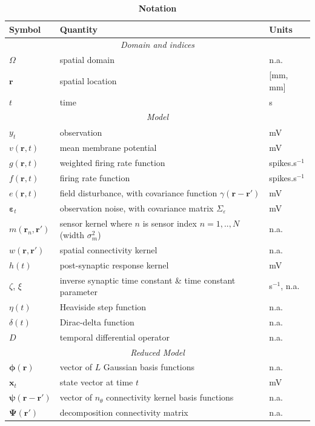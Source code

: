\documentclass[12pt]{iopart}
\begin{document}
\begin{table}[!ht]
\caption{
\bf{Notation}}
\begin{tabular}{|l|l|l|}
	\hline
	\textbf{Symbol} & \textbf{Quantity} & \textbf{Units}\\
	\hline
	\multicolumn{3}{|c|}{\emph{Domain and indices}}\\
	\hline
	$\Omega$ & spatial domain & n.a.\\
	$\mathbf{r}$ & spatial location & [mm, mm]\\
	$t$ & time & s\\
	\hline
	\multicolumn{3}{|c|}{\emph{Model}}\\
	\hline
    $y_t$ & observation & mV\\
    $v(\mathbf{r},t)$ & mean membrane potential & mV \\
	$g(\mathbf{r},t)$ & weighted firing rate function & spikes.s$^{-1}$\\
	$f(\mathbf{r},t)$ & firing rate function & spikes.s$^{-1}$\\
	$e(\mathbf{r},t)$ & field disturbance, with covariance function $\gamma(\mathbf r-\mathbf r')$ & mV\\
	$\boldsymbol\varepsilon_t$ & observation noise, with covariance matrix $\Sigma_\varepsilon$ & mV\\
	$m(\mathbf{r}_n,\mathbf{r}')$ & sensor kernel where $n$ is sensor index $n=1,..,N$ (width $\sigma_m^2$) & n.a. \\
	$w(\mathbf{r},\mathbf{r}')$ & spatial connectivity kernel & n.a.\\
	$h(t)$ & post-synaptic response kernel & mV\\
	$\zeta$, $\xi$ & inverse synaptic time constant \& time constant parameter & s$^{-1}$, n.a.\\
	$\eta(t)$ & Heaviside step function & n.a.\\
	$\delta(t)$ & Dirac-delta function & n.a.\\
	$D$ & temporal differential operator & n.a.\\
	\hline
	\multicolumn{3}{|c|}{\emph{Reduced Model}} \\
	\hline
   	$\boldsymbol\phi(\mathbf{r})$ & vector of $L$ Gaussian basis functions & n.a.\\
   	$\mathbf{x}_t$ & state vector at time $t$ & mV\\
   	$\boldsymbol{\psi}(\mathbf{r}-\mathbf{r}')$ & vector of $n_{\theta}$ connectivity kernel basis functions & n.a.\\
   	$\boldsymbol{\Psi}(\mathbf{r}')$ & decomposition connectivity matrix & n.a.\\

\end{tabular}
\end{table}
\end{document}
